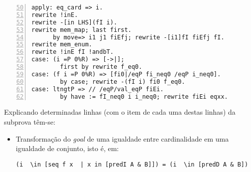 \begin{enumerate}[label=\textbf{\roman*.}]
\begin{enumerate}[label=\textbf{\roman{enumi}.(\alph*)}]
\begin{enumerate}[label=\textbf{(\alph{enumii}.\arabic*)}]
\begin{enumerate}[listparindent=\parindent]
                                        \begin{lstlisting}[language=coq,frame=single, numbers=left,stepnumber=1,tabsize=1, escapechar=@, firstnumber=50]
apply: eq_card => i.                                            @ \label{line:50-item4b-item2} @
rewrite !inE.                                                   @ \label{line:51-item4b-item2} @
rewrite -[in LHS](fI i).                                        @ \label{line:52-item4b-item2} @
rewrite mem_map; last first.                                    @ \label{line:53-item4b-item2} @
      by move=> i1 j1 fiEfj; rewrite -[i1]fI fiEfj fI.          @ \label{line:54-item4b-item2} @
rewrite mem_enum.                                               @ \label{line:55-item4b-item2} @
rewrite !inE fI !andbT.                                         @ \label{line:56-item4b-item2} @
case: (i =P 0%R) => [->|];                                      @ \label{line:57-item4b-item2} @
        first by rewrite f_eq0.                                 @ \label{line:58-item4b-item2} @
case: (f i =P 0%R) => [fi0|/eqP fi_neq0 /eqP i_neq0].           @ \label{line:59-item4b-item2} @
        by case; rewrite -(fI i) fi0 f_eq0.                     @ \label{line:60-item4b-item2} @
case: ltngtP => // /eqP/val_eqP fiEi.                           @ \label{line:61-item4b-item2} @
        by have := fI_neq0 i i_neq0; rewrite fiEi eqxx.         @ \label{line:62-item4b-item2} @
                                        \end{lstlisting}
                                Explicando determinadas linhas (com o item de cada uma destas linhas) da subprova têm-se:
                                        \begin{itemize}
                                                \item[\textbf{(\ref{line:50-item4b-item2})}] Transformação do \textit{goal} de uma igualdade entre cardinalidade em uma igualdade de conjunto, isto é, em:
                                                        \begin{lstlisting}[language=coq,frame=single,tabsize=1]
(i  \in [seq f x  | x in [predI A & B]]) = (i  \in [predD A & B])
                                                        \end{lstlisting}        
                                                

\end{itemize}
\end{enumerate}
\end{enumerate}
\end{enumerate}
\end{enumerate}
